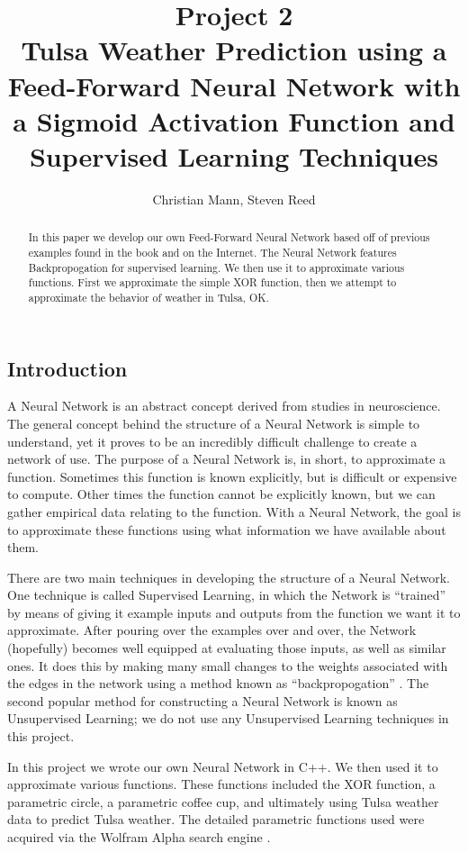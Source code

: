 \documentclass{article}
\title{Project 2\\Tulsa Weather Prediction using a Feed-Forward Neural Network with a Sigmoid Activation Function and Supervised Learning Techniques}
\author{Christian Mann, Steven Reed}
\begin{document}
\maketitle

\begin{multicols}{2}

\begin{abstract}
In this paper we develop our own Feed-Forward Neural Network based off of previous examples found in the book and on the Internet. The Neural Network features Backpropogation for supervised learning. We then use it to approximate various functions. First we approximate the simple XOR function, then we attempt to approximate the behavior of weather in Tulsa, OK.
\end{abstract}

\section{Introduction}

A Neural Network is an abstract concept derived from studies in neuroscience. The general concept behind the structure of a Neural Network is simple to understand, yet it proves to be an incredibly difficult challenge to create a network of use. The purpose of a Neural Network is, in short, to approximate a function. Sometimes this function is known explicitly, but is difficult or expensive to compute. Other times the function cannot be explicitly known, but we can gather empirical data relating to the function. With a Neural Network, the goal is to approximate these functions using what information we have available about them.

There are two main techniques in developing the structure of a Neural Network. One technique is called Supervised Learning, in which the Network is ``trained'' by means of giving it example inputs and outputs from the function we want it to approximate. After pouring over the examples over and over, the Network (hopefully) becomes well equipped at evaluating those inputs, as well as similar ones. It does this by making many small changes to the weights associated with the edges in the network using a method known as ``backpropogation'' \cite{trappenberg}. The second popular method for constructing a Neural Network is known as Unsupervised Learning; we do not use any Unsupervised Learning techniques in this project.

In this project we wrote our own Neural Network in C++. We then used it to approximate various functions. These functions included the XOR function, a parametric circle, a parametric coffee cup, and ultimately using Tulsa weather data to predict Tulsa weather. The detailed parametric functions used were acquired via the Wolfram Alpha search engine \cite{wolfram}.


\end{multicols}
\end{document}
